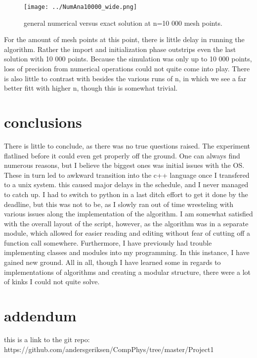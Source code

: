 \documentclass[10pt, twocolumn]{revtex4-1}
\begin{document}
\begin{figure}[hbtp]
\texttt{[image: ../NumAna10000\_wide.png]}
\caption{general numerical versus exact solution at n=10 000 mesh points.} 
\end{figure}
For the amount of mesh points at this point, there is little delay in running the algorithm. Rather the import and initialization phase outstrips even the last solution with 10 000 points. Because the simulation was only up to 10 000 points, loss of precision from numerical operations could not quite come into play. There is also little to contrast with besides the various runs of n, in which we see a far better fitt with higher n, though this is somewhat trivial. 

\section{conclusions}
There is little to conclude, as there was no true questions raised. The experiment flatlined before it could even get properly off the ground. One can always find numerous reasons, but I believe the biggest ones was initial issues with the OS. These in turn led to awkward transition into the c++ language once I transfered to a unix system. this caused major delays in the schedule, and I never managed to catch up. I had to switch to python in a last ditch effort to get it done by the deadline, but this was not to be, as I slowly ran out of time wresteling with various issues along the implementation of the algorithm. I am somewhat satisfied with the overall layout of the script, however, as the algorithm was in a separate module, which allowed for easier reading and editing without fear of cutting off a function call somewhere. Furthermore, I have previously had trouble implementing classes and modules into my programming. In this instance, I have gained new ground. All in all, though I have learned some in regards to implementations of algorithms and creating a modular structure, there were a lot of kinks I could not quite solve. 

\section{addendum}
this is a link to the git repo:
https://github.com/andersgeriksen/CompPhys/tree/master/Project1
\end{document}

